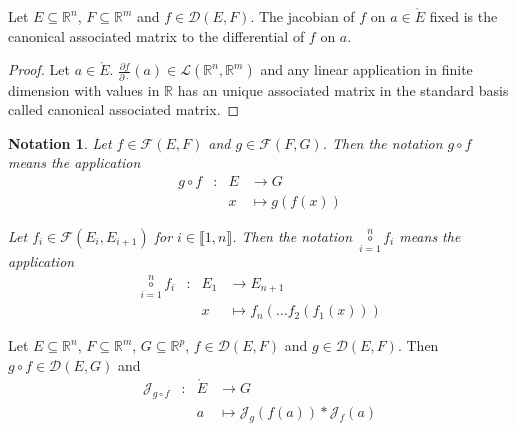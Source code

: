 \documentclass[11pt,en]{elegantpaper}
\newtheorem{notation}{Notation}
\newcommand{\Real}{\mathbb{R}}
\begin{document}
\begin{corollary}
  {\normalfont Let $E \subseteq \Real^n$, $F \subseteq \Real^m$ and $f \in \mathcal{D}(E,F)$.
  The jacobian of $f$ on $a \in \mathring{E}$ fixed is the canonical associated matrix to the differential of $f$ on $a$.} \par
   \par
\end{corollary}

\begin{proof}
  Let $a \in \mathring{E}$.
  $\frac{\partial f}{\partial \cdot}(a) \in \mathcal{L}(\Real^n,\Real^m)$ and any linear application in finite dimension
  with values in $\Real$ has an unique associated matrix in the standard basis called canonical associated matrix. \par
\end{proof}

\begin{notation}
  Let $f \in \mathcal{F}(E,F)$ and $g \in \mathcal{F}(F,G)$.
  Then the notation $g \circ f$ means the application \begin{equation*}
    \begin{array}{llll}
      g \circ f & : & E & \longrightarrow G \\
        &   & x & \longmapsto g(f(x))
    \end{array}
  \end{equation*} \par

  Let $f_i \in \mathcal{F}(E_i,E_{i+1})$ for $i \in \llbracket 1,n \rrbracket$.
  Then the notation $\underset{i=1}{\overset{n}\circ} f_i$ means the application \begin{equation*}
    \begin{array}{llll}
      \underset{i=1}{\overset{n}\circ} f_i & : & E_1 & \longrightarrow E_{n+1} \\
        &   & x & \longmapsto f_n( \ldots f_2(f_1(x)))
    \end{array}
  \end{equation*}
\end{notation}

\begin{theorem}
  {\normalfont Let $E \subseteq \Real^n$, $F \subseteq \Real^m$, $G \subseteq \Real^p$, $f \in \mathcal{D}(E,F)$ and $g \in \mathcal{D}(E,F)$.
  Then $g \circ f \in \mathcal{D}(E,G)$ and} \begin{equation} \label{theo:chain_rule}
    \begin{array}{llll}
      \mathcal{J}_{g \circ f} & : & \mathring{E} & \longrightarrow G \\
      &   & a & \longmapsto \mathcal{J}_{g}(f(a)) * \mathcal{J}_{f}(a)
    \end{array}
  \end{equation}
\end{theorem}
\end{document}
